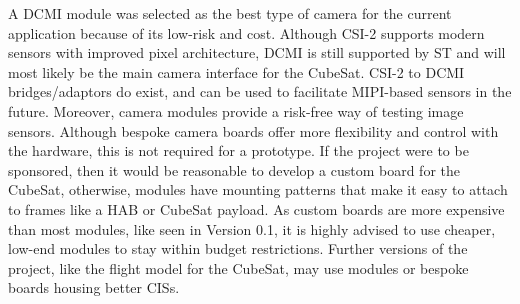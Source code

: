 A DCMI module was selected as the best type of camera for the current application because of its low-risk and cost. Although CSI-2 supports modern sensors with improved pixel architecture, DCMI is still supported by ST and will most likely be the main camera interface for the CubeSat. CSI-2 to DCMI bridges/adaptors do exist, and can be used to facilitate MIPI-based sensors in the future.
\nl
Moreover, camera modules provide a risk-free way of testing image sensors. Although bespoke camera boards offer more flexibility and control with the hardware, this is not required for a prototype. If the project were to be sponsored, then it would be reasonable to develop a custom board for the CubeSat, otherwise, modules have mounting patterns that make it easy to attach to frames like a HAB or CubeSat payload.
\nl
As custom boards are more expensive than most modules, like seen in Version 0.1, it is highly advised to use cheaper, low-end modules to stay within budget restrictions. Further versions of the project, like the flight model for the CubeSat, may use modules or bespoke boards housing better CISs.